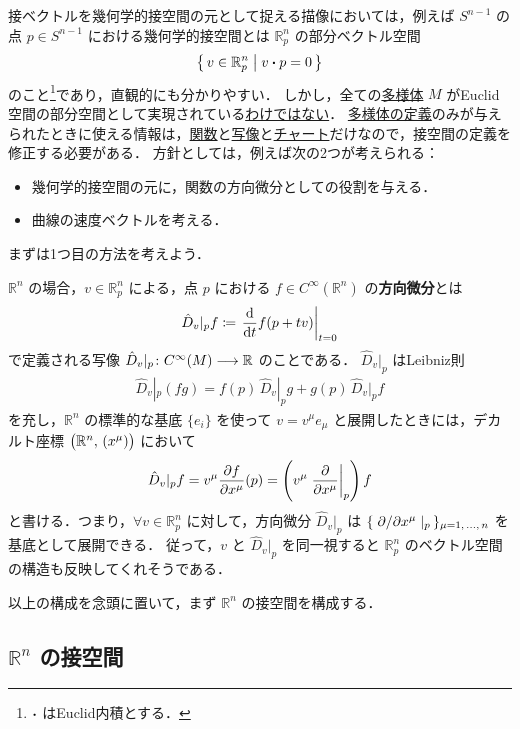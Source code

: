 \documentclass[geometry_main]{subfiles}
\begin{document}
接ベクトルを幾何学的接空間の元として捉える描像においては，例えば $S^{n-1}$ の点 $p \in S^{n-1}$ における幾何学的接空間とは $\mathbb{R}^n_p$ の部分ベクトル空間
\begin{align}
	\bigl\{\, v \in \mathbb{R}_p^n \bigm| v \vdot p = 0 \,\bigr\} 
\end{align}
のこと\footnote{$\vdot$ はEuclid内積とする．}であり，直観的にも分かりやすい．
しかし，全ての\hyperref[diffmani]{\cinfty 多様体} $M$ がEuclid空間の部分空間として実現されている\underline{わけではない}．
\hyperref[diffmani]{\cinfty 多様体の定義}のみが与えられたときに使える情報は，\hyperref[def.cinfty]{\cinfty 関数}と\hyperref[def.cinfty_mapping]{\cinfty 写像}と\hyperref[diffmani]{\cinfty チャート}だけなので，接空間の定義を修正する必要がある．
方針としては，例えば次の2つが考えられる：
\begin{itemize}
	\item 幾何学的接空間の元に，\cinfty 関数の方向微分としての役割を与える．
	\item \cinfty 曲線の速度ベクトルを考える．
\end{itemize}
まずは1つ目の方法を考えよう．

$\mathbb{R}^n$ の場合，$v \in \mathbb{R}^n_p$ による，点 $p$ における $f \in C^\infty (\mathbb{R}^n)$ の\textbf{方向微分}とは
\begin{align}
	\label{eq:directional}
	\hat{D}_{v}|_p f \coloneqq \eval{\dv{}{t}() f(p + tv)}_{t=0}
\end{align}
で定義される写像 $\hat{D}_v|_p \colon C^\infty (M) \longrightarrow \mathbb{R}$ のことである．
$\hat{D}_v|_p$ はLeibniz則
\begin{align}
	\hat{D}_v|_p (fg) = f(p)\, \hat{D}_v|_p g + g(p)\, \hat{D}_v|_p f
\end{align}
を充し，$\mathbb{R}^n$ の標準的な基底 $\{e_i\}$ を使って $v = v^\mu e_\mu$ と展開したときには，デカルト座標 $\bigl(\mathbb{R}^n,\, (x^\mu)\bigr)$ において
\begin{align}
	\hat{D}_v|_p f = v^\mu \pdv{f}{x^\mu}() (p) = \left( v^\mu \eval{\pdv{}{x^\mu}}_p \right) f
\end{align}
と書ける．つまり，$\forall v \in \mathbb{R}^n_p$ に対して，方向微分 $\hat{D}_v|_p$ は $\{\, \pdv*{}{x^\mu}|_p\, \}_{\mu = 1,\, \dots,\, n}$ を基底として展開できる．
従って，$v$ と $\hat{D}_v|_p$ を同一視すると $\mathbb{R}^n_p$ のベクトル空間の構造も反映してくれそうである．

以上の構成を念頭に置いて，まず $\mathbb{R}^n$ の接空間を構成する．

\subsection{$\mathbb{R}^n$ の接空間}
\end{document}
